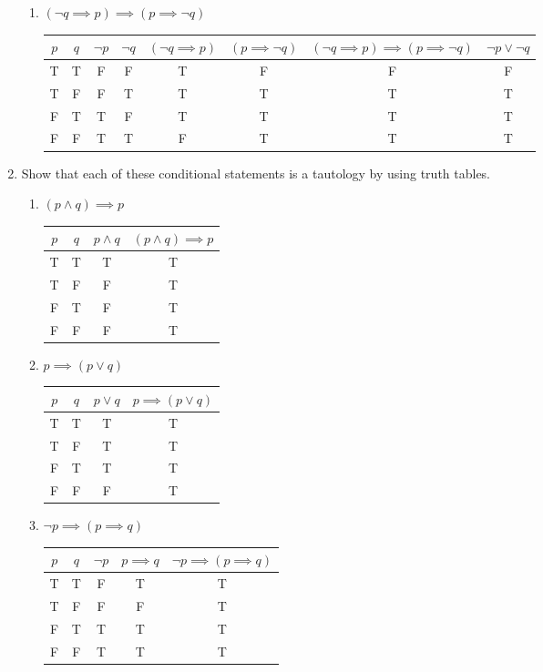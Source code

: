 \documentclass[11pt]{article}
\begin{document}
\begin{enumerate}[label=\textbf{\arabic*.}]
\begin{enumerate}[label=\textbf{\alph*)}]
		\item $(\neg q \implies p) \implies (p \implies \neg q)$
		
		\begin{tabular}{c | c | c | c | c | c | c | c}
			$p$ & $q$ & $\neg p$ & $\neg q$ & $(\neg q \implies p)$ & $(p \implies \neg q)$ & $(\neg q \implies p) \implies (p \implies \neg q)$ & $\neg p \lor \neg q$ \\
			\hline
			T & T & F & F & T & F & F & F \\
			T & F & F & T & T & T & T & T \\
			F & T & T & F & T & T & T & T \\
			F & F & T & T & F & T & T & T
		\end{tabular}
	\end{enumerate}

	\item Show that each of these conditional statements is a tautology by using truth tables.
	\begin{enumerate}[label=\textbf{\alph*)}]
		\item $(p \land q) \implies p$
		
		\begin{tabular}{c | c | c | c}
			$p$ & $q$ & $p \land q$ & $(p \land q) \implies p$ \\
			\hline
			T & T & T & T \\
			T & F & F & T \\
			F & T & F & T \\
			F & F & F & T
		\end{tabular}
		
		\item $p \implies (p \lor q)$
		
		\begin{tabular}{c | c | c | c}
			$p$ & $q$ & $p \lor q$ & $p \implies (p \lor q)$ \\
			\hline
			T & T & T & T \\
			T & F & T & T \\
			F & T & T & T \\
			F & F & F & T 
		\end{tabular}
	
		\item $\neg p \implies (p \implies q)$
		
		\begin{tabular}{c | c | c | c | c}
			$p$ & $q$ & $\neg p$ & $p \implies q$ & $\neg p \implies (p \implies q)$ \\
			\hline
			T & T & F & T & T \\
			T & F & F & F & T \\
			F & T & T & T & T \\
			F & F & T & T & T
		\end{tabular}
		

\end{enumerate}
\end{enumerate}
\end{document}
